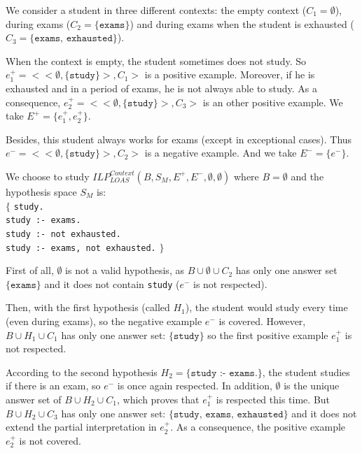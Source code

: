 \begin{example}
We consider a student in three different contexts: the empty context ($C_1=\emptyset$), during exams ($C_2=\{\texttt{exams}\}$) and during exams when the student is exhausted ($C_3=\{\texttt{exams, exhausted}\}$).

\bigskip

When the context is empty, the student sometimes does not study. So $e^+_1=<<\emptyset, \{\texttt{study}\}>,C_1>$ is a positive example. Moreover, if he is exhausted and in a period of exams, he is not always able to study. As a consequence, $e^+_2=<<\emptyset, \{\texttt{study}\}>,C_3>$ is an other positive example. We take $E^+=\{e^+_1,e^+_2\}$.

\bigskip

Besides, this student always works for exams (except in exceptional cases). Thus $e^-=<<\emptyset, \{\texttt{study}\}>,C_2>$ is a negative example. And we take $E^-=\{e^-\}$.

\bigskip

We choose to study $ILP_{LOAS}^{Context}(B, S_M, E^+, E^-, \emptyset, \emptyset)$ where $B=\emptyset$ and the hypothesis space $S_M$ is:\\
$\{$ \texttt{study.\\
study :- exams.\\
study :- not exhausted.\\
study :- exams, not exhausted.} $\}$

\bigskip

First of all, $\emptyset$ is not a valid hypothesis, as $B\cup \emptyset \cup C_2$ has only one answer set $\{\texttt{exams}\}$ and it does not contain \texttt{study} ($e^-$ is not respected). 

\bigskip

Then, with the first hypothesis (called $H_1$), the student would study every time (even during exams), so the negative example $e^-$ is covered. However, $B \cup H_1 \cup C_1$ has only one answer set: $\{\texttt{study}\}$ so the first positive example $e^+_1$ is not respected. 
	
\bigskip

According to the second hypothesis $H_2=\{\texttt{study :- exams.}\}$, the student studies if there is an exam, so $e^-$ is once again respected. In addition, $\emptyset$ is the unique answer set of $B\cup H_2 \cup C_1$, which proves that $e^+_1$ is respected this time. But $B\cup H_2 \cup C_3$ has only one answer set: $\{\texttt{study, exams, exhausted}\}$ and it does not extend the partial interpretation in $e^+_2$. As a consequence, the positive example $e^+_2$ is not covered.


\end{example}
